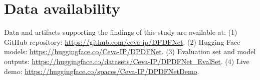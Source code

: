 \documentclass[final,5p,times,authoryear]{elsarticle}
\begin{document}
\section*{Data availability}
Data and artifacts supporting the findings of this study are available at:
(1) GitHub repository: \url{https://github.com/ceva-ip/DPDFNet}. 
(2) Hugging Face models: \url{https://huggingface.co/Ceva-IP/DPDFNet}. 
(3) Evaluation set and model outputs: \url{https://huggingface.co/datasets/Ceva-IP/DPDFNet_EvalSet}.
(4) Live demo: \url{https://huggingface.co/spaces/Ceva-IP/DPDFNetDemo}.






\end{document}
